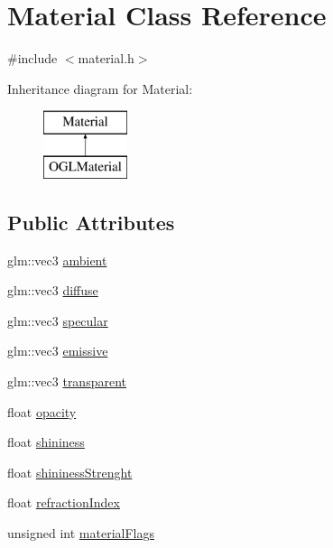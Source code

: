 \hypertarget{class_material}{}\section{Material Class Reference}
\label{class_material}


{\ttfamily \#include $<$material.\+h$>$}

Inheritance diagram for Material\+:\begin{figure}[H]
\begin{center}
\leavevmode
\includegraphics[height=2.000000cm]{class_material}
\end{center}
\end{figure}
\subsection*{Public Attributes}
\begin{DoxyCompactItemize}
\item 
glm\+::vec3 \hyperlink{class_material_af99c823542e497c98a35d1aac5fc9012}{ambient}
\item 
glm\+::vec3 \hyperlink{class_material_a099904e2f5a7bbec3cba6bf8ec546b11}{diffuse}
\item 
glm\+::vec3 \hyperlink{class_material_aac1c499923ff99564cdd97a4b5e504a9}{specular}
\item 
glm\+::vec3 \hyperlink{class_material_ab35396b9c5340ce4a785884c54fbe2ac}{emissive}
\item 
glm\+::vec3 \hyperlink{class_material_ad65e6df916690d7a2e59d18ec3f25c1c}{transparent}
\item 
float \hyperlink{class_material_a4ddb4745b69e0b8747ef819bc3e3ceee}{opacity}
\item 
float \hyperlink{class_material_a9dc184c883ec135ace28c1917af3fe84}{shininess}
\item 
float \hyperlink{class_material_a39204190f2a9ff5e1d3ff8f109c97d67}{shininess\+Strenght}
\item 
float \hyperlink{class_material_a52b96d96f3a3c9bf506fd7dc7ff6f40a}{refraction\+Index}
\item 
unsigned int \hyperlink{class_material_a86b8ac102b9af92d5bc715efd4068a91}{material\+Flags}
\end{DoxyCompactItemize}


